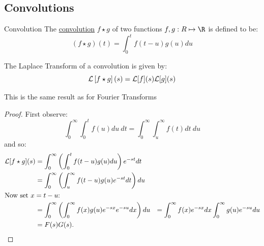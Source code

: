 \documentclass[../Main.tex]{subfiles}
\begin{document}
\subsection{Convolutions}
\begin{definition}{Convolution}
    The \underline{convolution} $f \star g$ of two functions $f,g : R \mapsto \R$ is defined to be:
    \begin{equation*}
        (f \star g)(t) = \int_{0}^{t} f(t - u) g(u) du
    \end{equation*}
\end{definition}
\begin{theorem}
    The Laplace Transform of a convolution is given by:
    \begin{equation}
        \mathcal{L}\left[f \star g\right](s) = \mathcal{L}[f](s) \mathcal{L}[g](s)
        \label{eqnConvolutionTheorem}
    \end{equation}
    \label{thmConvolution}
\end{theorem}
\begin{remark}
    This is the same result as for Fourier Transforms
\end{remark}
\begin{proof}
    First observe:
    \begin{equation*}
        \int_{0}^{\infty} \int_{0}^{t} f(u) du~dt = \int_{0}^{\infty} \int_{u}^{\infty} f(t) dt~ du 
    \end{equation*}
    and so:
    \begin{align*}
        \mathcal{L}[f \star g](s) &= \int_{0}^{\infty} \left(\int_{0}^{t} f(t-u)g(u) du\right)e^{-st} dt \\
        &= \int_{0}^{\infty} \left(\int_{u}^{\infty} f(t - u)g(u) e^{-st} dt \right) du \\
        \intertext{Now set $x = t - u$:}
        &= \int_{0}^{\infty} \left(\int_{0}^{\infty} f(x)g(u) e^{-sx} e^{-su} dx \right) du
        &= \int_{0}^{\infty} f(x)e^{-sx} dx \int_{0}^{\infty} g(u)e^{-su} du \\
        &= F(s)G(s).
    \end{align*}
\end{proof}
\end{document}
